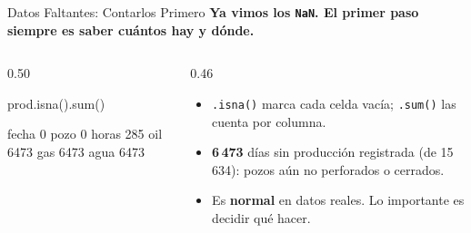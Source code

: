 \documentclass[aspectratio=169, 11pt]{beamer}
\begin{document}
\begin{frame}[fragile,shrink=15]{Datos Faltantes: Contarlos Primero}
  \vspace{-4pt}
  {\small\color{arcaDark}\bfseries
    Ya vimos los \texttt{NaN}. El primer paso siempre es saber \textbf{cuántos hay y dónde}.}

  \vspace{4pt}
  \begin{columns}[T]
    \begin{column}{0.50\textwidth}
      \begin{pyblock}
prod.isna().sum()
      \end{pyblock}
      \vspace{2pt}
      \begin{outputblock}
fecha       0
pozo        0
horas     285
oil      6473
gas      6473
agua     6473
      \end{outputblock}
    \end{column}

    \begin{column}{0.46\textwidth}
      {\scriptsize\color{textMuted}
      \begin{itemize}\setlength{\itemsep}{5pt}
        \item[{\color{arcaRed}\scriptsize\faArrowRight}]
          \texttt{.isna()} marca cada celda vacía;
          \texttt{.sum()} las cuenta por columna.
        \item[{\color{arcaRed}\scriptsize\faArrowRight}]
          \textbf{6\,473} días sin producción registrada
          (de 15\,634): pozos aún no perforados
          o cerrados.
        \item[{\color{codeGreen}\scriptsize\faCheck}]
          Es \textbf{normal} en datos reales.
          Lo importante es decidir qué hacer.
      \end{itemize}
      }
    \end{column}
  \end{columns}
\end{frame}
\end{document}
